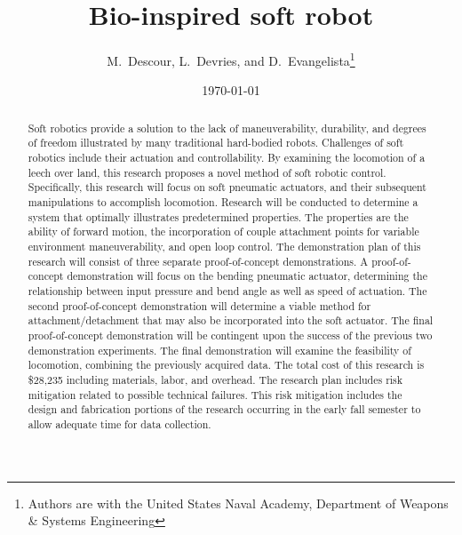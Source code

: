 \documentclass{IEEEtran}
\title{Bio-inspired soft robot}
\author{M.~Descour, L.~Devries, and D.~Evangelista\thanks{Authors are with the United States Naval Academy, Department of Weapons \& Systems Engineering}}
\date{\today}
\begin{document}
\maketitle

\begin{abstract}
Soft robotics provide a solution to the lack of maneuverability, durability, and degrees of freedom illustrated by many traditional hard-bodied robots. Challenges of soft robotics include their actuation and controllability. By examining the locomotion of a leech over land, this research proposes a novel method of soft robotic control. Specifically, this research will focus on soft pneumatic actuators, and their subsequent manipulations to accomplish locomotion. Research will be conducted to determine a system that optimally illustrates predetermined properties. The properties are the ability of forward motion, the incorporation of couple attachment points for variable environment maneuverability, and open loop control. The demonstration plan of this research will consist of three separate proof-of-concept demonstrations. A proof-of-concept demonstration will focus on the bending pneumatic actuator, determining the relationship between input pressure and bend angle as well as speed of actuation. The second proof-of-concept demonstration will determine a viable method for attachment/detachment that may also be incorporated into the soft actuator. The final proof-of-concept demonstration will be contingent upon the success of the previous two demonstration experiments. The final demonstration will examine the feasibility of locomotion, combining the previously acquired data. The total cost of this research is \$28,235 including materials, labor, and overhead. The research plan includes risk mitigation related to possible technical failures. This risk mitigation includes the design and fabrication portions of the research occurring in the early fall semester to allow adequate time for data collection.
\end{abstract}
     
\end{document}
